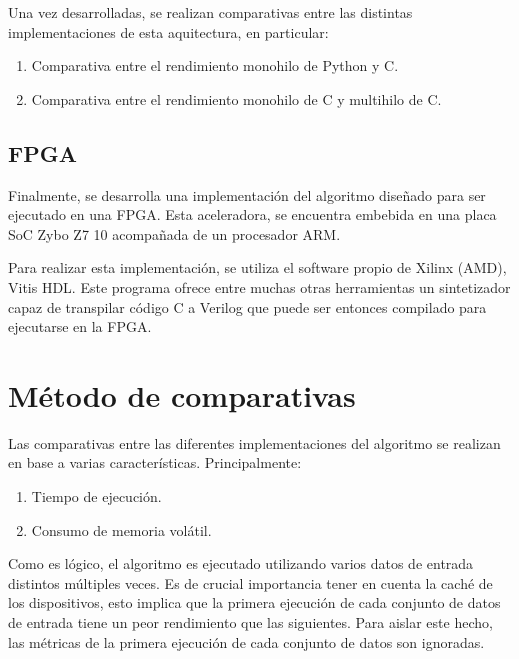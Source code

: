 Una vez desarrolladas,
se realizan comparativas entre las distintas implementaciones
de esta aquitectura, en particular:

\begin{enumerate}[itemsep=0.25px]
    \item Comparativa entre el rendimiento monohilo de Python y C.
    \item Comparativa entre el rendimiento monohilo de C y multihilo de C.
\end{enumerate}

\subsection{FPGA}

Finalmente, se desarrolla una implementación del algoritmo
diseñado para ser ejecutado en una FPGA\@.
Esta aceleradora, se encuentra embebida en una placa SoC
Zybo Z7 10 acompañada de un procesador ARM\@.

Para realizar esta implementación,
se utiliza el software propio de Xilinx (AMD),
Vitis HDL\@.
Este programa ofrece entre muchas otras herramientas
un sintetizador capaz de transpilar código C a Verilog
que puede ser entonces compilado
para ejecutarse en la FPGA\@.

\section{Método de comparativas}

Las comparativas entre las diferentes implementaciones
del algoritmo se realizan en base a varias características.
Principalmente:

\begin{enumerate}[itemsep=0.25px]
    \item Tiempo de ejecución.
    \item Consumo de memoria volátil.
\end{enumerate}

Como es lógico, el algoritmo es ejecutado utilizando
varios datos de entrada distintos múltiples veces.
Es de crucial importancia tener en cuenta la
caché de los dispositivos,
esto implica que la primera ejecución de cada conjunto de datos
de entrada tiene un peor rendimiento que las siguientes.
Para aislar este hecho, las métricas de la
primera ejecución de cada conjunto de datos son ignoradas.
